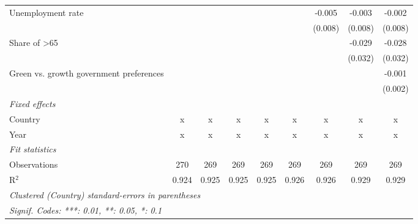 \begin{table}[htbp]
\begin{tabular}{lcccccccc}
      Unemployment rate                                             &         &         &         &         &         & -0.005  & -0.003  & -0.002\\   
                                                                    &         &         &         &         &         & (0.008) & (0.008) & (0.008)\\   
      Share of >65                                                  &         &         &         &         &         &         & -0.029  & -0.028\\   
                                                                    &         &         &         &         &         &         & (0.032) & (0.032)\\   
      Green vs. growth government preferences                       &         &         &         &         &         &         &         & -0.001\\   
                                                                    &         &         &         &         &         &         &         & (0.002)\\   
      \emph{Fixed effects}\\
      Country                                                       & x       & x       & x       & x       & x       & x       & x       & x\\  
      Year                                                          & x       & x       & x       & x       & x       & x       & x       & x\\  
      \midrule \emph{Fit statistics}\\
      Observations                                                  & 270     & 269     & 269     & 269     & 269     & 269     & 269     & 269\\  
      R$^2$                                                         & 0.924   & 0.925   & 0.925   & 0.925   & 0.926   & 0.926   & 0.929   & 0.929\\  
      \midrule
      \multicolumn{9}{l}{\emph{Clustered (Country) standard-errors in parentheses}}\\
      \multicolumn{9}{l}{\emph{Signif. Codes: ***: 0.01, **: 0.05, *: 0.1}}\\
   \end{tabular}
\end{table}


